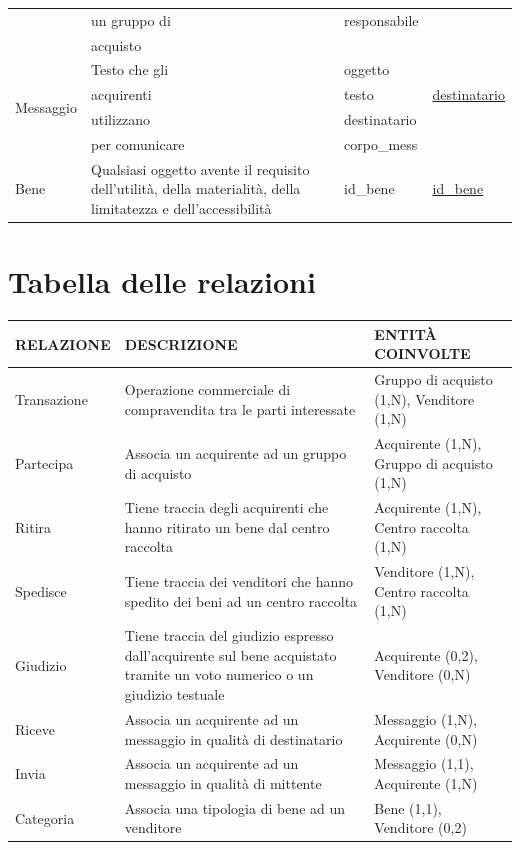 \documentclass[a4paper, 10pt]{report}
\begin{document}
\begin{longtable}[!h]{|l|p{3cm}|p{3cm}|p{4cm}|}
                                    & un gruppo di & responsabile &\\
                                    & acquisto & &\\
\hline
\multirow{4}{*}{Messaggio} 
                           &Testo che gli & oggetto &\\
                           & acquirenti & testo &\underline{destinatario}\\
                           & utilizzano & destinatario & \\ 
                           & per comunicare & corpo\_mess & \\
\hline
Bene & Qualsiasi oggetto avente il requisito dell'utilit\`a, della materialit\`a, della limitatezza e dell'accessibilit\`a & id\_bene & \underline{id\_bene} \\
\hline
\end{longtable}

\section{Tabella delle relazioni}
\begin{longtable}{|l|p{4cm}|l|}
\hline
\textbf{RELAZIONE}&\textbf{DESCRIZIONE}&\textbf{ENTIT\`A COINVOLTE}\\
\hline
Transazione & Operazione commerciale di compravendita tra le parti interessate & Gruppo di acquisto (1,N), Venditore (1,N)  \\
\hline
Partecipa & Associa un acquirente ad un gruppo di acquisto & Acquirente (1,N), Gruppo di acquisto (1,N) \\
\hline
Ritira & Tiene traccia degli acquirenti che hanno ritirato un bene dal centro raccolta & Acquirente (1,N), Centro raccolta (1,N) \\
\hline
Spedisce & Tiene traccia dei venditori che hanno spedito dei beni ad un centro raccolta & Venditore (1,N), Centro raccolta (1,N) \\
\hline
Giudizio & Tiene traccia del giudizio espresso dall'acquirente sul bene acquistato tramite un voto numerico o un giudizio testuale & Acquirente (0,2), Venditore (0,N) \\
\hline
Riceve & Associa un acquirente ad un messaggio in qualit\`a di destinatario & Messaggio (1,N), Acquirente (0,N) \\
\hline
Invia & Associa un acquirente ad un messaggio in qualit\`a di mittente & Messaggio (1,1), Acquirente (1,N) \\
\hline
Categoria & Associa una tipologia di bene ad un venditore & Bene (1,1), Venditore (0,2) \\
\hline
\end{longtable}
\end{document}
